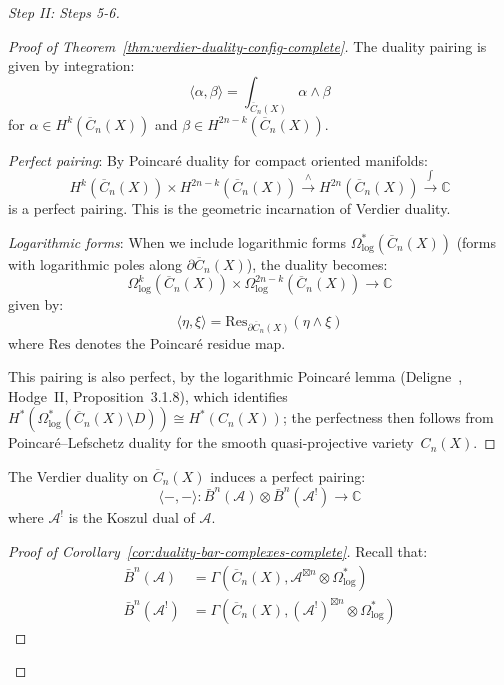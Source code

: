 \begin{proof}[Step II: Steps 5-6]
\begin{proof}[Proof of Theorem~\ref{thm:verdier-duality-config-complete}]
The duality pairing is given by integration:
\begin{equation}
\langle \alpha, \beta \rangle = \int_{\overline{C}_n(X)} \alpha \wedge \beta
\end{equation}
for $\alpha \in H^k(\overline{C}_n(X))$ and $\beta \in H^{2n-k}(\overline{C}_n(X))$.

\emph{Perfect pairing}: By Poincaré duality for compact oriented manifolds:
\begin{equation}
H^k(\overline{C}_n(X)) \times H^{2n-k}(\overline{C}_n(X)) \xrightarrow{\wedge} 
H^{2n}(\overline{C}_n(X)) \xrightarrow{\int} \mathbb{C}
\end{equation}
is a perfect pairing. This is the geometric incarnation of Verdier duality.

\emph{Logarithmic forms}: When we include logarithmic forms $\Omega^*_{\log}(
\overline{C}_n(X))$ (forms with logarithmic poles along $\partial \overline{C}_n(X)$), 
the duality becomes:
\begin{equation}
\Omega^k_{\log}(\overline{C}_n(X)) \times \Omega^{2n-k}_{\log}(\overline{C}_n(X)) 
\to \mathbb{C}
\end{equation}
given by:
\begin{equation}
\langle \eta, \xi \rangle = \text{Res}_{\partial \overline{C}_n(X)} (\eta \wedge \xi)
\end{equation}
where $\text{Res}$ denotes the Poincaré residue map.

This pairing is also perfect, by the logarithmic Poincar\'e lemma
(Deligne~\cite{Deligne71}, Hodge~II, Proposition~3.1.8), which
identifies $H^*(\Omega^*_{\log}(\overline{C}_n(X) \setminus D))
\cong H^*(C_n(X))$; the perfectness then follows from
Poincar\'e--Lefschetz duality for the smooth quasi-projective
variety~$C_n(X)$.
\end{proof}

\begin{corollary}
\label{cor:duality-bar-complexes-complete}
The Verdier duality on $\overline{C}_n(X)$ induces a perfect pairing:
\begin{equation}
\langle -, - \rangle: \bar{B}^n(\mathcal{A}) \otimes \bar{B}^n(\mathcal{A}^!) \to 
\mathbb{C}
\end{equation}
where $\mathcal{A}^!$ is the Koszul dual of $\mathcal{A}$.
\end{corollary}

\begin{proof}[Proof of Corollary~\ref{cor:duality-bar-complexes-complete}]
Recall that:
\begin{align}
\bar{B}^n(\mathcal{A}) &= \Gamma(\overline{C}_n(X), \mathcal{A}^{\boxtimes n} \otimes 
\Omega^*_{\log})\\
\bar{B}^n(\mathcal{A}^!) &= \Gamma(\overline{C}_n(X), (\mathcal{A}^!)^{\boxtimes n} 
\otimes \Omega^*_{\log})
\end{align}


\end{proof}
\end{proof}
